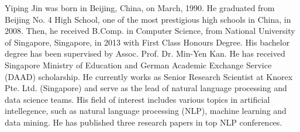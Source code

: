 \begin{biography}
Yiping Jin was born in Beijing, China, on March, 1990.
He graduated from Beijing No. 4 High School, one of the most prestigious high schools in China, in 2008. 
Then, he received B.Comp. in Computer Science, from National University of Singapore, Singapore, in 2013 with First Class Honours Degree.
His bachelor degree has been supervised by Assoc. Prof. Dr. Min-Yen Kan.
He has received Singapore Ministry of Education and German Academic Exchange Service (DAAD) scholarship.
He currently works as Senior Research Scientist at Knorex Pte. Ltd. (Singapore) and serve as the lead of natural language processing and data science teams.
His field of interest includes various topics in artificial intellegence, such as natural language processing (NLP), machine learning and data mining. He has published three research papers in top NLP conferences.
\end{biography}
